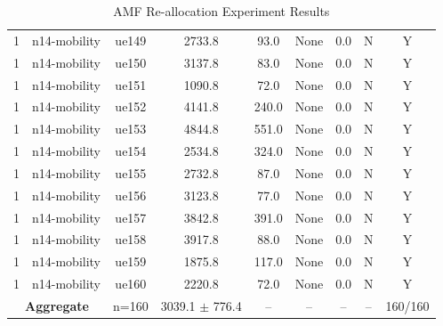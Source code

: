 \begin{table}[ht]
\begin{tabular}{|c|c|c|c|c|c|c|c|c|}
1 & n14-mobility & ue149 & 2733.8 & 93.0 & None & 0.0 & N & Y \\
1 & n14-mobility & ue150 & 3137.8 & 83.0 & None & 0.0 & N & Y \\
1 & n14-mobility & ue151 & 1090.8 & 72.0 & None & 0.0 & N & Y \\
1 & n14-mobility & ue152 & 4141.8 & 240.0 & None & 0.0 & N & Y \\
1 & n14-mobility & ue153 & 4844.8 & 551.0 & None & 0.0 & N & Y \\
1 & n14-mobility & ue154 & 2534.8 & 324.0 & None & 0.0 & N & Y \\
1 & n14-mobility & ue155 & 2732.8 & 87.0 & None & 0.0 & N & Y \\
1 & n14-mobility & ue156 & 3123.8 & 77.0 & None & 0.0 & N & Y \\
1 & n14-mobility & ue157 & 3842.8 & 391.0 & None & 0.0 & N & Y \\
1 & n14-mobility & ue158 & 3917.8 & 88.0 & None & 0.0 & N & Y \\
1 & n14-mobility & ue159 & 1875.8 & 117.0 & None & 0.0 & N & Y \\
1 & n14-mobility & ue160 & 2220.8 & 72.0 & None & 0.0 & N & Y \\
\multicolumn{2}{|c|}{\textbf{Aggregate}} & n=160 & 3039.1 $\pm$ 776.4 & -- & -- & -- & -- & 160/160 \\
\hline
\end{tabular}
\caption{AMF Re-allocation Experiment Results}
\label{tab:amf_realloc}
\end{table}
